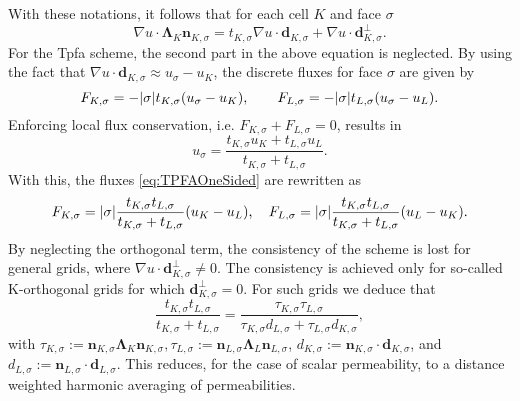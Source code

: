 With these notations, it follows that for each cell $K$ and face $\sigma$
\begin{equation}
\nabla u \cdot \mathbf{\Lambda}_K \mathbf{n}_{K, \sigma} =  t_{K,\sigma} \nabla u \cdot \mathbf{d}_{K,\sigma} + \nabla u \cdot \mathbf{d}^{\bot}_{K,\sigma}.
\end{equation}
For the Tpfa scheme, the second part in the above equation is neglected. By using the fact that $\nabla u \cdot \mathbf{d}_{K,\sigma} \approx u_\sigma - u_K$, the discrete fluxes for face $\sigma$ are given by
\begin{equation}
F_{K,\sigma} = -\lvert{\sigma}\rvert  t_{K,\sigma} (u_\sigma - u_K), \qquad F_{L,\sigma} = -\lvert{\sigma}\rvert  t_{L,\sigma} (u_\sigma - u_L).
\label{eq:TPFAOneSided}
\end{equation}
Enforcing local flux conservation, i.e. $F_{K,\sigma}+F_{L,\sigma}=0$, results in
\begin{equation}
u_\sigma = \frac{t_{K,\sigma} u_K + t_{L,\sigma} u_L}{t_{K,\sigma}  + t_{L,\sigma}}.
\end{equation}
With this, the fluxes \eqref{eq:TPFAOneSided} are rewritten as
\begin{equation}
F_{K,\sigma} = \lvert{\sigma}\rvert  \frac{t_{K,\sigma} t_{L,\sigma}}{t_{K,\sigma} + t_{L,\sigma}} (u_K - u_L), \quad F_{L,\sigma} = \lvert{\sigma}\rvert  \frac{t_{K,\sigma} t_{L,\sigma}}{t_{K,\sigma} + t_{L,\sigma}} (u_L - u_K).
\label{eq:TPFAFlux}
\end{equation}
By neglecting the orthogonal term, the consistency of the scheme is lost for general grids, where $\nabla u \cdot \mathbf{d}^{\bot}_{K,\sigma} \not = 0$. The consistency is achieved only for so-called K-orthogonal grids for which $\mathbf{d}^{\bot}_{K,\sigma} = 0$. For such grids we deduce that
\begin{equation}
\frac{t_{K,\sigma} t_{L,\sigma}}{t_{K,\sigma} + t_{L,\sigma}} = \frac{\tau_{K,\sigma} \tau_{L,\sigma}}{\tau_{K,\sigma} d_{L,\sigma} + \tau_{L,\sigma} d_{K,\sigma}},
\label{eq:TPFAcoeffNew}
\end{equation}
with $\tau_{K,\sigma} := \mathbf{n}_{K, \sigma} \mathbf{\Lambda}_K\mathbf{n}_{K, \sigma}, \tau_{L,\sigma} := \mathbf{n}_{L, \sigma} \mathbf{\Lambda}_L\mathbf{n}_{L, \sigma}$, $d_{K,\sigma}:= \mathbf{n}_{K, \sigma} \cdot \mathbf{d}_{K, \sigma}$, and $d_{L,\sigma}:= \mathbf{n}_{L, \sigma} \cdot \mathbf{d}_{L, \sigma}$. This reduces, for the case of scalar permeability, to a distance weighted harmonic averaging of permeabilities.



